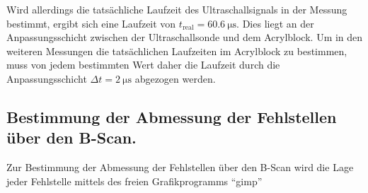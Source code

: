 Wird allerdings die tatsächliche Laufzeit des Ultraschallsignals in der Messung bestimmt, ergibt sich eine Laufzeit von ${t_\mathrm{real}=\SI{60.6}{\micro\second}}$. Dies liegt an der Anpassungsschicht zwischen der Ultraschallsonde und dem Acrylblock. Um in den weiteren Messungen die tatsächlichen Laufzeiten im Acrylblock zu bestimmen, muss von jedem bestimmten Wert daher die Laufzeit durch die Anpassungsschicht ${\Delta t=\SI{2}{\micro\second}}$ abgezogen werden.











\subsection{Bestimmung der Abmessung der Fehlstellen über den B-Scan.}
Zur Bestimmung der Abmessung der Fehlstellen über den B-Scan wird die Lage jeder Fehlstelle mittels des freien Grafikprogramms \enquote{gimp}













